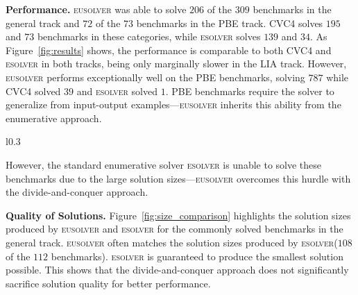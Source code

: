 \documentclass{llncs}
\newcommand{\dcsolve}{{\sffamily\fontsize{8.5}{10}\selectfont
    DCSolve}\xspace}
\renewcommand{\paragraph}[1]{\par\noindent\textbf{#1.}}
\newcommand{\esolver}{\textsc{esolver}\xspace}
\newcommand{\eusolver}{\textsc{eusolver}\xspace}
\begin{document}
\paragraph{Performance}
\eusolver was able to solve $206$ of the $309$ benchmarks in the
general track and $72$ of the $73$ benchmarks in the
PBE track.
CVC4 solves $195$ and $73$ benchmarks in these categories, while
\esolver solves $139$ and $34$.
As Figure~\ref{fig:results} shows, the performance is comparable to both
CVC4 and \esolver in both tracks, being only marginally slower in
the LIA track.
However, \eusolver performs exceptionally well on the PBE benchmarks,
solving $787$ while CVC4 solved $39$ and \esolver solved $1$.
PBE benchmarks require the solver
to generalize from input-output examples---\eusolver inherits this
ability from the enumerative approach.
\begin{wrapfigure}{l}{0.3\textwidth}%
\centering
  \caption{Scatter plot of \eusolver and \esolver solution sizes.}
    \label{fig:size_comparison}
\vspace*{-1ex}
\end{wrapfigure}
However, the standard enumerative solver \esolver is unable to solve
these benchmarks due to the large solution sizes---\eusolver overcomes
this hurdle with the divide-and-conquer approach.


\paragraph{Quality of Solutions}
Figure~\ref{fig:size_comparison} highlights the solution sizes produced by
\eusolver and \esolver  for the commonly solved benchmarks in the
general track.
\eusolver often matches the solution sizes produced by
\esolver ($108$ of the $112$ benchmarks).
\esolver is guaranteed to produce the smallest solution
possible.
This shows that the divide-and-conquer approach
does not significantly sacrifice solution quality for better
performance.
\end{document}
